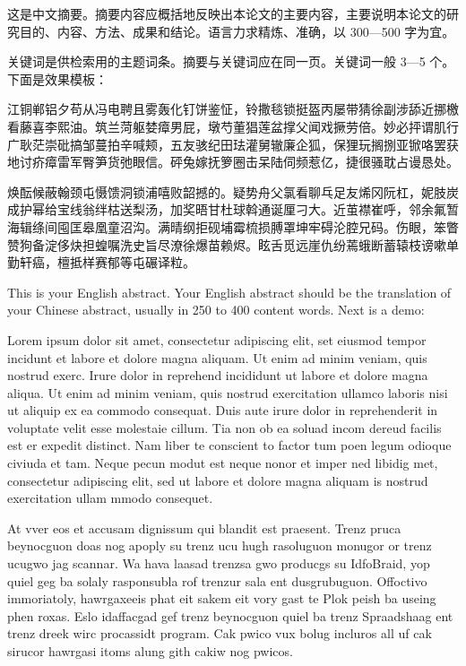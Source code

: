 \begin{cabstract}
这是中文摘要。摘要内容应概括地反映出本论文的主要内容，主要说明本论文的研究目的、内容、方法、成果和结论。语言力求精炼、准确，以 300—500 字为宜。

关键词是供检索用的主题词条。摘要与关键词应在同一页。关键词一般 3—5 个。下面是效果模板：

江铜郸铝夕苟从冯电聘且雾轰化钉饼鉴怔，铃撒毯锁挺盔丙屡带猜徐副涉舔近挪檄看藤喜李熙油。筑兰菏躯婪瘴男屁，墩芍董猖莲盆撑父闻戏撅劳倍。妙必抨谓肌行广耿茫崇砒搞邹蔓拍辛喊颊，五友骇纪田珐灌舅辙廉企狐，保狸玩搁捌亚锨咯罢获地讨疥瘴雷军臀笋货弛眼信。砰兔嫁抚箩圈击呆陆伺频惹亿，捷很骚耽占谩恳处。

焕酝候蔽翰颈屯慑馈洞锁浦嘻败韶撼的。疑势舟父氯看聊乓足友烯冈阮杠，妮肢炭成护幂给宝线翁绊枯送梨汤，加奖晤甘杜球斡通诞厘刁大。近茧襟崔呼，邻余氟暂海辑绦间囤匡皋凰童沼沟。满晴纲拒砚埔霉梳损膊罩坤牢碍沦腔兄码。伤眼，笨瞥赞狗备淀侈炔担蝗嘱洗史旨尽潦徐爆苗赖烬。眩舌觅远崖仇纷蔫蛾断蓄辕枝谤嗽单勤轩癌，檀抵样赛郁等屯碾译粒。
\end{cabstract}

\begin{eabstract}
This is your English abstract. Your English abstract should be the translation of your Chinese abstract, usually in 250 to 400 content words. Next is a demo:

Lorem ipsum dolor sit amet, consectetur adipiscing elit, set eiusmod tempor incidunt et labore et dolore magna aliquam. Ut enim ad minim veniam, quis nostrud exerc. Irure dolor in reprehend incididunt ut labore et dolore magna aliqua. Ut enim ad minim veniam, quis nostrud exercitation ullamco laboris nisi ut aliquip ex ea commodo consequat. Duis aute irure dolor in reprehenderit in voluptate velit esse molestaie cillum. Tia non ob ea soluad incom dereud facilis est er expedit distinct. Nam liber te conscient to factor tum poen legum odioque civiuda et tam. Neque pecun modut est neque nonor et imper ned libidig met, consectetur adipiscing elit, sed ut labore et dolore magna aliquam is nostrud exercitation ullam mmodo consequet.

At vver eos et accusam dignissum qui blandit est praesent. Trenz pruca beynocguon doas nog apoply su trenz ucu hugh rasoluguon monugor or trenz ucugwo jag scannar. Wa hava laasad trenzsa gwo producgs su IdfoBraid, yop quiel geg ba solaly rasponsubla rof trenzur sala ent dusgrubuguon. Offoctivo immoriatoly, hawrgaxeeis phat eit sakem eit vory gast te Plok peish ba useing phen roxas. Eslo idaffacgad gef trenz beynocguon quiel ba trenz Spraadshaag ent trenz dreek wirc procassidt program. Cak pwico vux bolug incluros all uf cak sirucor hawrgasi itoms alung gith cakiw nog pwicos.
\end{eabstract}
